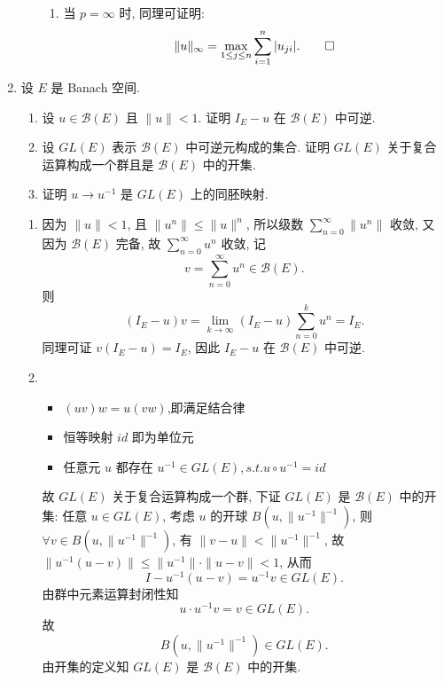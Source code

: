 \begin{enumerate}
\begin{answer}
\begin{enumerate}
\begin{enumerate}
            \item 当 $p=\infty$ 时, 同理可证明:
            \[\|u\|_{\infty}=\max\limits_{1\leq j\leq n}\sum_{i=1}^n|u_{ji}|.\qedhere\]
          \end{enumerate}  
      \end{enumerate}
    \end{answer}
  \item 设 $E$ 是 Banach 空间.
    \begin{enumerate}
      \item 设 $u\in\mathcal{B}(E)$ 且 $\|u\|<1$. 证明 $I_E-u$ 在 $\mathcal{B}(E)$ 中可逆.
      \item 设 $GL(E)$ 表示 $\mathcal{B}(E)$ 中可逆元构成的集合. 证明 $GL(E)$ 关于复合运算构成一个群且是 $\mathcal{B}(E)$ 中的开集.
      \item 证明 $u\to u^{-1}$ 是 $GL(E)$ 上的同胚映射.
    \end{enumerate}
    \begin{answer}
      \begin{enumerate}
        \item 因为 $\|u\|<1$, 且 $\|u^n\|\leq\|u\|^n$, 所以级数 $\sum_{n=0}^{\infty}\|u^n\|$ 收敛, 
        又因为 $\mathcal{B}(E)$ 完备, 故 $\sum_{n=0}^{\infty}u^n$ 收敛, 记
        \[v=\sum_{n=0}^{\infty}u^n\in\mathcal{B}(E).\]
        则
        \[(I_E-u)v=\lim_{k\to\infty}(I_E-u)\sum_{n=0}^ku^n=I_E.\]
        同理可证 $v(I_E-u)=I_E$, 因此 $I_E-u$ 在 $\mathcal{B}(E)$ 中可逆.
        
        \item 
        \begin{itemize}
        \item $(uv)w=u(vw)$,即满足结合律
        \item 恒等映射 $id$ 即为单位元
        \item 任意元 $u$ 都存在 $u^{-1}\in GL(E),s.t.u\circ u^{-1}=id$
        \end{itemize}
        故 $GL(E)$ 关于复合运算构成一个群, 
        下证 $GL(E)$ 是 $\mathcal{B}(E)$ 中的开集: 
        任意 $u\in GL(E)$, 考虑 $u$ 的开球 $B(u,\|u^{-1}\|^{-1})$, 
        则 $\forall v\in B(u,\|u^{-1}\|^{-1})$, 有 $\|v-u\|<\|u^{-1}\|^{-1}$, 
        故 $\|u^{-1}(u-v)\|\leq \|u^{-1}\|\cdot\|u-v\|<1$, 从而
        \[I-u^{-1}(u-v)=u^{-1}v\in GL(E).\]
        由群中元素运算封闭性知
        \[u\cdot u^{-1}v=v\in GL(E).\]
        故
        \[B(u,\|u^{-1}\|^{-1})\in GL(E).\]
        由开集的定义知 $GL(E)$ 是 $\mathcal{B}(E)$ 中的开集.
        

\end{enumerate}
\end{answer}
\end{enumerate}
